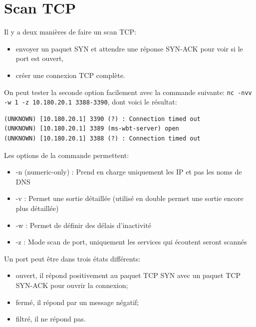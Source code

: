 \documentclass[french,paper=a4,oneside,captions=tableheading]{article}
\begin{document}
\appendix \newpage

























\section{Scan TCP}

Il y a deux manières de faire un scan TCP:
\begin{itemize}
    \item envoyer un paquet SYN et attendre une réponse SYN-ACK pour voir si le port est ouvert,
    \item créer une connexion TCP complète.
\end{itemize}

On peut tester la seconde option facilement avec la commande suivante: \texttt{nc -nvv -w 1 -z 10.180.20.1 3388-3390}, dont voici le résultat:
\begin{example}
\begin{Verbatim}
(UNKNOWN) [10.180.20.1] 3390 (?) : Connection timed out
(UNKNOWN) [10.180.20.1] 3389 (ms-wbt-server) open
(UNKNOWN) [10.180.20.1] 3388 (?) : Connection timed out
\end{Verbatim}
\end{example}

Les options de la commande permettent:
\begin{itemize}
    \item -n (numeric-only) : Prend en charge uniquement les IP et pas les noms de DNS
    \item -v : Permet une sortie détaillée (utilisé en double permet une sortie encore plus détaillée)
    \item -w : Permet de définir des délais d'inactivité
    \item -z : Mode scan de port, uniquement les services qui écoutent seront scannés
\end{itemize}

Un port peut être dans trois états différents:
\begin{itemize}
    \item ouvert, il répond positivement au paquet TCP SYN avec un paquet TCP SYN-ACK pour ouvrir la connexion;
    \item fermé, il répond par un message négatif;
    \item filtré, il ne répond pas.
\end{itemize}
\end{document}
